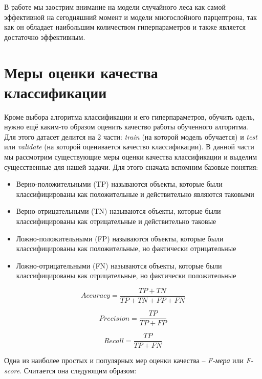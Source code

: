 \documentclass[times,specification,annotation]{itmo-student-thesis}
\begin{document}
	В работе мы заострим внимание на модели случайного леса как самой эффективной на сегодняшний момент и модели многослойного парцептрона, так как он обладает наибольшим количеством гиперпараметров и также является достаточно эффективным.
	
	\section{Меры оценки качества классификации}
	Кроме выбора алгоритма классификации и его гиперпараметров, обучить одель, нужно ещё каким-то образом оценить качество работы обученного алгоритма. Для этого датасет делится на 2 части: \textit{train} (на которой модель обучается) и \textit{test} или \textit{validate} (на которой оценивается качество классификации). В данной части мы рассмотрим существующие меры оценки качества классификации и выделим сущесственные для нашей задачи. Для этого сначала вспомним базовые понятия:
	\begin{itemize}
		\item Верно-положительными (TP) называются объекты, которые были классифицированы как положительные и действительно являются таковыми
		\item Верно-отрицательными (TN) называются объекты, которые были классифицированы как отрицательные и действительно таковые 
		\item Ложно-положительными (FP) называются объекты, которые были классифицированы как положительные, но фактически отрицательные
		\item Ложно-отрицательными (FN) называются объекты, которые были классифицированы как отрицательные, но фактически положительные
	\end{itemize}

	\begin{equation}
	Accuracy = \frac{TP+TN}{TP+TN+FP+FN} 
	\label{eq:accuracy}
	\end{equation}
	
	\begin{equation} 
	Precision = \frac{TP}{TP+FP} 
	\label{eq:precision}
	\end{equation}
	
	\begin{equation}
	Recall =  \frac{TP}{TP+FN}
	\label{eq:recall}
	\end{equation}
	
	Одна из наиболее простых и популярных мер оценки качества -- \textit{F-мера} или \textit{F-score}. Считается она следующим образом:
	
\end{document}
